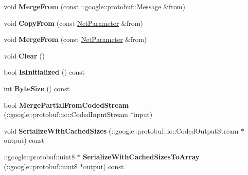 \begin{DoxyCompactItemize}
\mbox{\label{classcaffe_1_1_net_parameter_ac193cf00f8a540e2eb250c9d8d303a58}} 
void {\bfseries Merge\+From} (const \+::google\+::protobuf\+::\+Message \&from)
\item 
\mbox{\label{classcaffe_1_1_net_parameter_a0ab6e3ad513633ec11de614dd14cba84}} 
void {\bfseries Copy\+From} (const \mbox{\hyperlink{classcaffe_1_1_net_parameter}{Net\+Parameter}} \&from)
\item 
\mbox{\label{classcaffe_1_1_net_parameter_a71d8d073a4338df7bcf1ae5989f67a3c}} 
void {\bfseries Merge\+From} (const \mbox{\hyperlink{classcaffe_1_1_net_parameter}{Net\+Parameter}} \&from)
\item 
\mbox{\label{classcaffe_1_1_net_parameter_a0f07e912faf035aa6fec8b68176bffa6}} 
void {\bfseries Clear} ()
\item 
\mbox{\label{classcaffe_1_1_net_parameter_a032ac97ebba2724ad111dc4a506278d0}} 
bool {\bfseries Is\+Initialized} () const
\item 
\mbox{\label{classcaffe_1_1_net_parameter_ae0a3dd0c4ea482c1b2653c44991cd71e}} 
int {\bfseries Byte\+Size} () const
\item 
\mbox{\label{classcaffe_1_1_net_parameter_a1a55cdefaf13c8896111916cdc77c946}} 
bool {\bfseries Merge\+Partial\+From\+Coded\+Stream} (\+::google\+::protobuf\+::io\+::\+Coded\+Input\+Stream $\ast$input)
\item 
\mbox{\label{classcaffe_1_1_net_parameter_aa73ebb83e591457231ca386213c558f6}} 
void {\bfseries Serialize\+With\+Cached\+Sizes} (\+::google\+::protobuf\+::io\+::\+Coded\+Output\+Stream $\ast$output) const
\item 
\mbox{\label{classcaffe_1_1_net_parameter_a95238fa4859849a22e932c174ddf678f}} 
\+::google\+::protobuf\+::uint8 $\ast$ {\bfseries Serialize\+With\+Cached\+Sizes\+To\+Array} (\+::google\+::protobuf\+::uint8 $\ast$output) const
\item 

\end{DoxyCompactItemize}
